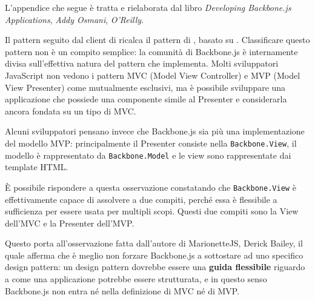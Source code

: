 


L'appendice che segue è tratta e rielaborata dal libro \emph{Developing Backbone.js Applications}, \emph{Addy Osmani}, \emph{O'Reilly}.

Il pattern seguito dal client di \proj{} ricalca il pattern di \jointjs, basato su \backbonejs. Classificare questo pattern non è un compito semplice: la comunità di Backbone.js è internamente divisa sull'effettiva natura del pattern che implementa. Molti sviluppatori JavaScript non vedono i pattern MVC (Model View Controller) e MVP (Model View Presenter) come mutualmente esclusivi, ma è possibile sviluppare una applicazione che possiede una componente simile al Presenter e considerarla ancora fondata su un tipo di MVC.

Alcuni sviluppatori pensano invece che Backbone.js sia più una implementazione del modello MVP: principalmente il Presenter consiste nella \texttt{Backbone.View}, il modello è rappresentato da \texttt{Backbone.Model} e le view sono rappresentate dai template HTML. 

È possibile rispondere a questa osservazione constatando che \texttt{Backbone.View} è effettivamente capace di assolvere a due compiti, perché essa è flessibile a sufficienza per essere usata per multipli scopi. Questi due compiti sono la View dell'MVC e la Presenter dell'MVP.

Questo porta all'osservazione fatta dall'autore di MarionetteJS, Derick Bailey, il quale afferma che è meglio non forzare Backbone.js a sottostare ad uno specifico design pattern: un design pattern dovrebbe essere una \textbf{guida flessibile} riguardo a come una applicazione potrebbe essere strutturata, e in questo senso Backbone.js non entra né nella definizione di MVC né di MVP.
